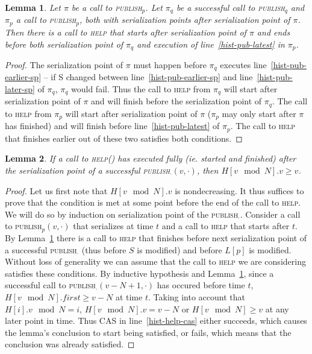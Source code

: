 \documentclass[a4paper,11pt]{article}
\newtheorem{lemma}{Lemma}
\newcommand{\fn}[1]{\textsc{#1}}
\begin{document}
\begin{lemma}\label{lem-hist-help-comes}
Let $\pi$ be a call to \fn{publish$_p$}. Let $\pi_q$ be a successful call to \fn{publish$_q$} and $\pi_p$ a call to \fn{publish$_p$}, both with serialization points after serialization point of $\pi$. Then there is a call to \fn{help} that starts after serialization point of $\pi$ and ends before both serialization point of $\pi_q$ and execution of line~\ref{hist-pub-latest} in $\pi_p$.
\end{lemma}
\begin{proof}
The serialization point of $\pi$ must happen before $\pi_q$ executes line~\ref{hist-pub-earlier-sp} -- if S changed between line~\ref{hist-pub-earlier-sp} and line~\ref{hist-pub-later-sp} of $\pi_q$, $\pi_q$ would fail.
Thus the call to \fn{help} from $\pi_q$ will start after serialization point of $\pi$ and will finish before the serialization point of $\pi_q$. The call to \fn{help}
from $\pi_p$ will start after serialization point of $\pi$ ($\pi_p$ may only start after $\pi$ has finished) and will finish before line~\ref{hist-pub-latest} of $\pi_p$.
The call to \fn{help} that finishes earlier out of these two satisfies both conditions.
\end{proof}

\begin{lemma}
\label{lem-hist-is-complete}
If a call to \fn{help}() has executed fully (ie. started and finished) after the serialization point of a successful \fn{publish$_\cdot$}$(v, \cdot)$, then $H[v\mod N].v \geq v$.
\end{lemma}
\begin{proof}
Let us first note that $H[v\mod N].v$ is nondecreasing.
It thus suffices to prove that the condition is met at some point before the end of the call to \fn{help}. We will do so by induction on serialization point of the \fn{publish$_\cdot$}.
Consider a call to \fn{publish$_p$}$(v, \cdot)$ that serializes at time $t$ and a call to \fn{help} that starts after $t$. By Lemma~\ref{lem-hist-help-comes} there is a call to \fn{help} that finishes before next serialization point of a successful \fn{publish$_\cdot$} (thus before $S$
is modified) and before $L[p]$ is modified. Without loss of generality we can assume that the call to \fn{help} we are considering satisfies these conditions. By inductive hypothesis and Lemma~\ref{lem-hist-help-comes}, since a successful call to \fn{publish$_\cdot$}$(v-N+1, \cdot)$ has occured before time $t$, $H[v \mod N].first \geq v-N$ at time $t$. Taking into account that $H[i].v \mod N = i$, $H[v \mod N].v = v-N$ or $H[v \mod N] \geq v$ at any later point in time.
Thus CAS in line~\ref{hist-help-cas} either succeeds, which causes the lemma's conclusion to start being satisfied, or fails, which means that the conclusion was already satisfied.
\end{proof}
\end{document}

